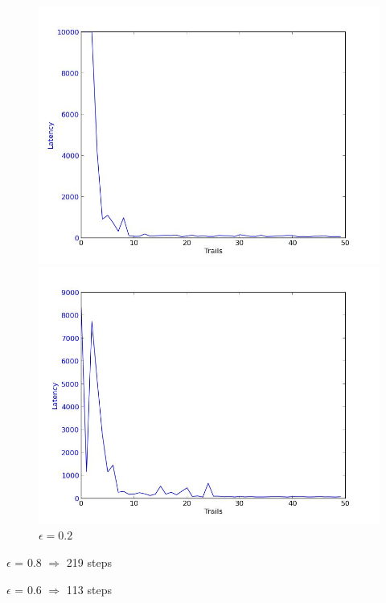 \documentclass[a4paper, 11pt]{article}
\begin{document}
\begin{figure}
  \centering
  \begin{minipage}[c]{0.5\textwidth}
    \centering
    \includegraphics[scale=0.3]{../figure/eps4.jpeg}
  \caption{$\epsilon = 0.4$}
  \end{minipage}%
  \begin{minipage}[c]{0.5\textwidth}
    \centering
    \includegraphics[scale=0.3]{../figure/eps2.jpeg}
  \caption{$\epsilon = 0.2$}
  \end{minipage}
\end{figure}


$\epsilon$ = 0.8 $\Rightarrow$ 219 steps

$\epsilon$ = 0.6 $\Rightarrow$ 113 steps
\end{document}
